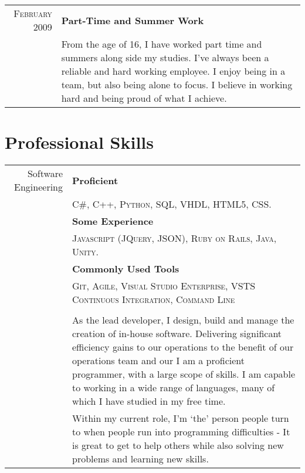 \documentclass[a4paper,11pt]{article}
\begin{document}
\begin{tabular}{r|p{12.5cm}}
        \textsc{February 2009}
        & \textbf{Part-Time and Summer Work}\\
        & \footnotesize{From the age of 16, I have worked part time and summers along side my studies. I've always been a reliable and hard working employee. I enjoy being in a team, but also being alone to focus. I believe in working hard and being proud of what I achieve.}\\
        
\end{tabular}

\section{Professional Skills}
\begin{tabular}{r|p{13cm}}
    Software Engineering  
        & \textbf{Proficient} \\
        & \footnotesize{\textsc{C\#, C++, Python, SQL, VHDL, HTML5, CSS.}} \\
        & \textbf{Some Experience} \\
        & \footnotesize{\textsc{Javascript (JQuery, JSON), Ruby on Rails, Java, Unity.}}\\
        & \textbf{Commonly Used Tools} \\
        & \footnotesize{\textsc{Git, Agile, Visual Studio Enterprise, VSTS Continuous Integration, Command Line}}\\
        & \\
        & As the lead developer, I design, build and manage the creation of in-house software. Delivering significant efficiency gains to our operations to the benefit of our operations team and our 
        I am a proficient programmer, with a large scope of skills. I am capable to working in a wide range of languages, many of which I have studied in my free time.\\
        & Within my current role, I'm `the' person people turn to when people run into programming difficulties - It is great to get to help others while also solving new problems and learning new skills. \\
        

\end{tabular}
\end{document}
